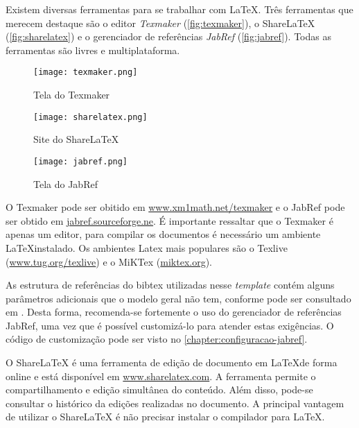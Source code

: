 Existem diversas ferramentas para se trabalhar com \LaTeX. Três ferramentas que merecem destaque são o editor \textit{Texmaker} (\autoref{fig:texmaker}), o ShareLaTeX (\autoref{fig:sharelatex}) e o gerenciador de referências \textit{JabRef} (\autoref{fig:jabref}). Todas as ferramentas são livres e multiplataforma. 

\begin{figure}[htb]
\caption{Tela do Texmaker}
 \label{fig:texmaker}
 \centering
 \texttt{[image: texmaker.png]}
 \fautor
\end{figure}

\begin{figure}[htb]
\caption{Site do ShareLaTeX}
 \label{fig:sharelatex}
 \centering
 \texttt{[image: sharelatex.png]}
 \fautor
\end{figure}

\begin{figure}[htb]
 \caption{Tela do JabRef}
 \label{fig:jabref}
 \centering
 \texttt{[image: jabref.png]}
\fautor
\end{figure}

O Texmaker pode ser obitido em \url{www.xm1math.net/texmaker} e o JabRef pode ser obtido em \url{jabref.sourceforge.ne}. É importante ressaltar que o Texmaker é apenas um editor, para compilar os documentos é necessário um ambiente \LaTeX instalado. Os ambientes Latex mais populares são o Texlive (\url{www.tug.org/texlive}) e o MiKTex (\url{miktex.org}). 

As estrutura de referências do bibtex utilizadas nesse \textit{template} contém alguns parâmetros adicionais que o modelo geral não tem, conforme pode ser consultado em . Desta forma, recomenda-se fortemente o uso do gerenciador de referências JabRef, uma vez que é possível customizá-lo para atender estas exigências. O código de customização pode ser visto no \autoref{chapter:configuracao-jabref}.

O ShareLaTeX é uma ferramenta de edição de documento em \LaTeX de forma online e está disponível em \url{www.sharelatex.com}. A ferramenta permite o compartilhamento e edição simultânea do conteúdo. Além disso, pode-se consultar o histórico da edições realizadas no documento. A principal vantagem de utilizar o ShareLaTeX é não precisar instalar o compilador para LaTeX.